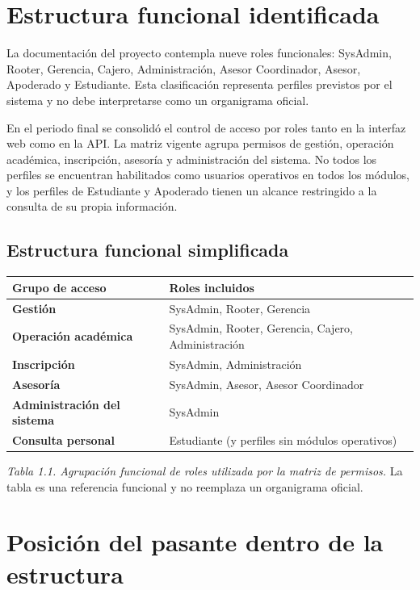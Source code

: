 \documentclass[12pt,a4paper,oneside]{report}
\begin{document}
\section{Estructura funcional identificada}

La documentación del proyecto contempla nueve roles funcionales: SysAdmin, Rooter, Gerencia, Cajero, Administración, Asesor Coordinador, Asesor, Apoderado y Estudiante. Esta clasificación representa perfiles previstos por el sistema y no debe interpretarse como un organigrama oficial.

En el periodo final se consolidó el control de acceso por roles tanto en la interfaz web como en la API. La matriz vigente agrupa permisos de gestión, operación académica, inscripción, asesoría y administración del sistema. No todos los perfiles se encuentran habilitados como usuarios operativos en todos los módulos, y los perfiles de Estudiante y Apoderado tienen un alcance restringido a la consulta de su propia información.

\subsection{Estructura funcional simplificada}

\begin{center}
\renewcommand{\arraystretch}{1.25}
\begin{tabularx}{\textwidth}{@{}>{\bfseries}p{3.2cm}X@{}}
  \toprule
  Grupo de acceso & Roles incluidos \\
  \midrule
  Gestión & SysAdmin, Rooter, Gerencia \\
  Operación académica & SysAdmin, Rooter, Gerencia, Cajero, Administración \\
  Inscripción & SysAdmin, Administración \\
  Asesoría & SysAdmin, Asesor, Asesor Coordinador \\
  Administración del sistema & SysAdmin \\
  Consulta personal & Estudiante (y perfiles sin módulos operativos) \\
  \bottomrule
\end{tabularx}
\end{center}

\emph{Tabla 1.1. Agrupación funcional de roles utilizada por la matriz de permisos.} La tabla es una referencia funcional y no reemplaza un organigrama oficial.

\section{Posición del pasante dentro de la estructura}
\end{document}
